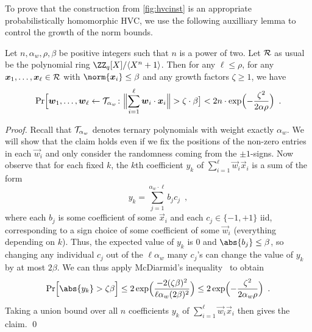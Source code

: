 To prove that the construction from \autoref{fig:hvcinst} is an appropriate probabilistically homomorphic HVC, we use the following auxilliary lemma to control the growth of the norm bounds.
\begin{lemma}\label{lem:normgrowth}
Let $n, \alpha_w, \rho, \beta$ be positive integers such that $n$ is a power of two.
Let $\mathcal{R}$ as usual be the polynomial ring $\defringq$.
Then for any $\ell\leq \rho$, for any $\boldsymbol{x}_1,\ldots,\boldsymbol{x}_\ell\in \mathcal{R}$ with $\norm{\vec{x}_i}\leq \beta$ and any growth factors $\zeta \geq 1$, we have
\[
 \Pr\Bigl[\vec{w}_1,\ldots,\vec{w}_\ell \gets \tern_{\alpha_w}\colon \Bigl\|\smashoperator{\sum_{i=1}^{\ell}} \vec{w}_i\cdot \vec{x}_i\Bigr\| > \zeta\cdot \beta \bigr] < 2n\cdot \exp\Bigl(-\frac{\zeta^2}{2\alpha\rho}\Bigr)\enspace.
\]
\end{lemma}
\begin{proof}
Recall that $\mathcal{T}_{\alpha_w}$ denotes ternary polynomials with weight exactly $\alpha_w$. We will show that the claim holds even if we fix the positions of the non-zero entries in each $\vec{w}_i$ and only consider the randomness coming from the $\pm 1$-signs.
Now observe that for each fixed $k$, the $k$th coefficient $y_k$ of $\sum_{i=1}^{\ell} \vec{w}_i \vec{x}_i$ is a sum of the form
\[
 y_k = \sum_{j=1}^{\alpha_w\cdot \ell} b_j c_j\enspace,
\]
where each $b_j$ is some coefficient of some $\vec{x}_i$ and each $c_j\in\{-1,+1\}$ iid, corresponding to a sign choice of some coefficient of some $\vec{w}_i$ (everything depending on $k$).
Thus, the expected value of $y_k$ is 0 and $\abs{b_j}\leq \beta$, so changing any individual $c_j$ out of the $\ell\alpha_w$ many $c_j$'s can change the value of $y_k$ by at most $2\beta$.
We can thus apply McDiarmid's inequality~\cite{McDiarmid89} to obtain
\[
 \Pr\Bigl[\abs{y_k} > \zeta\beta\Bigr] \leq 2\exp\Bigl(\frac{-2(\zeta\beta)^2}{\ell\alpha_w(2\beta)^2}\Bigr) \leq 2\exp\Bigl(- \frac{\zeta^2}{2\alpha_w\rho} \Bigr)\enspace.
\]
Taking a union bound over all $n$ coefficients $y_k$ of $\sum_{i=1}^{\ell} \vec{w}_i \vec{x}_i$ then gives the claim.
\qed
\end{proof}


